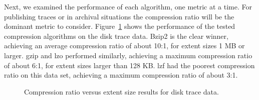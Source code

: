 
Next, we examined the performance of each algorithm, one metric at a time.
For publishing traces or in archival situations the compression ratio will be the dominant
metric to consider.  Figure~\ref{fig:comRatio} shows the performance
of the tested compression algorithms on the disk trace data.
Bzip2 is the clear winner, achieving an average compression
ratio of about 10:1, for extent sizes 1 MB or larger.  
gzip and lzo performed similarly, achieving a maximum compression
ratio of about 6:1, for extent sizes larger than 128 KB.
lzf had the poorest compression ratio on this data set, achieving a
maximum compression ratio of about 3:1.

\begin{figure}[tbh]
\caption{ Compression ratio versus extent size results for disk trace data.}
\label{fig:comRatio}
\end{figure}


